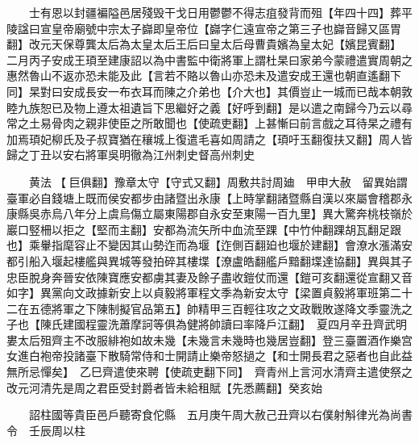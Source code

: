　　士有恩以封疆褊隘邑居殘毁干戈日用鬱鬱不得志疽發背而殂【年四十四】葬平陵諡曰宣皇帝廟號中宗太子巋即皇帝位【巋字仁遠宣帝之第三子也巋音歸又區胃翻】改元天保尊龔太后為太皇太后王后曰皇太后母曹貴嬪為皇太妃【嬪昆賓翻】　二月丙子安成王頊至建康詔以為中書監中衛將軍上謂杜杲曰家弟今蒙禮遣實周朝之惠然魯山不返亦恐未能及此【言若不賂以魯山亦恐未及遣安成王還也朝直遙翻下同】杲對曰安成長安一布衣耳而陳之介弟也【介大也】其價豈止一城而已哉本朝敦睦九族恕已及物上遵太祖遺旨下思繼好之義【好呼到翻】是以遣之南歸今乃云以尋常之土易骨肉之親非使臣之所敢聞也【使疏吏翻】上甚慚曰前言戲之耳待杲之禮有加焉頊妃柳氏及子叔寶猶在穰城上復遣毛喜如周請之【頊吁玉翻復扶又翻】周人皆歸之丁丑以安右將軍吳明徹為江州刺史督高州刺史

　　黄法【巨俱翻】豫章太守【守式又翻】周敷共討周廸　甲申大赦　留異始謂臺軍必自錢塘上既而侯安都步由諸暨出永康【上時掌翻諸暨縣自漢以來屬會稽郡永康縣吳赤烏八年分上虞烏傷立屬東陽郡自永安至東陽一百九里】異大驚奔桃枝嶺於巖口竪柵以拒之【堅而主翻】安都為流矢所中血流至踝【中竹仲翻踝胡瓦翻足跟也】乘轝指麾容止不變因其山勢迮而為堰【迮側百翻廹也堰於建翻】會潦水漲滿安都引船入堰起樓艦與異城等發拍碎其樓堞【潦盧皓翻艦戶黯翻堞達協翻】異與其子忠臣脫身奔晉安依陳寶應安都虜其妻及餘子盡收鎧仗而還【鎧可亥翻還從宣翻又音如字】異黨向文政據新安上以貞毅將軍程文季為新安太守【梁置貞毅將軍班第二十二在五德將軍之下陳制擬官品第五】帥精甲三百輕往攻之文政戰敗遂降文季靈洗之子也【陳氏建國程靈洗蕭摩訶等俱為健將帥讀曰率降戶江翻】　夏四月辛丑齊武明婁太后殂齊主不改服緋袍如故未幾【未幾言未幾時也幾居豈翻】登三臺置酒作樂宫女進白袍帝投諸臺下散騎常侍和士開請止樂帝怒撾之【和士開長君之惡者也自此益無所忌憚矣】　乙巳齊遣使來聘【使疏吏翻下同】　齊青州上言河水清齊主遣使祭之改元河清先是周之君臣受封爵者皆未給租賦【先悉薦翻】癸亥始

　　詔柱國等貴臣邑戶聽寄食佗縣　五月庚午周大赦己丑齊以右僕射斛律光為尚書令　壬辰周以柱

